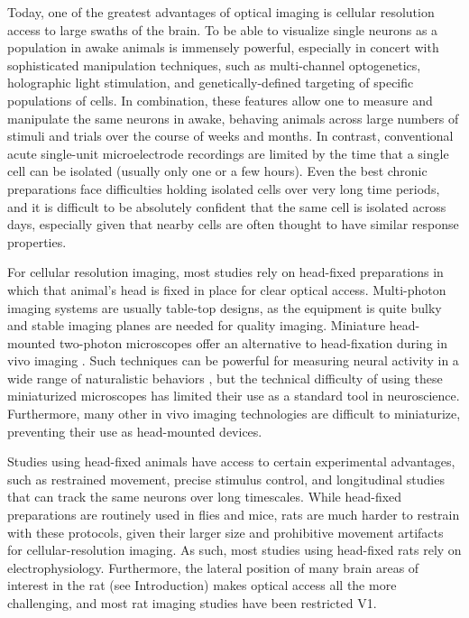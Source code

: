 Today, one of the greatest advantages of optical imaging is cellular resolution access to large swaths of the brain. To be able to visualize single neurons as a population in awake animals is immensely powerful, especially in concert with sophisticated manipulation techniques, such as multi-channel optogenetics\cite{Kampasi2018, Yang2018}, holographic light stimulation\cite{Gill2020, Chong2019, Carrillo-Reid2019}, and genetically-defined targeting of specific populations of cells\cite{Daigle2018}. In combination, these features allow one to measure and manipulate the same neurons in awake, behaving animals across large numbers of stimuli and trials over the course of weeks and months. In contrast, conventional acute single-unit microelectrode recordings are limited by the time that a single cell can be isolated (usually only one or a few hours). Even the best chronic preparations face difficulties holding isolated cells over very long time periods, and it is difficult to be absolutely confident that the same cell is isolated across days, especially given that nearby cells are often thought to have similar response properties.

For cellular resolution imaging, most studies rely on head-fixed preparations in which that animal's head is fixed in place for clear optical access. Multi-photon imaging systems are usually table-top designs, as the equipment is quite bulky and stable imaging planes are needed for quality imaging. Miniature head-mounted two-photon microscopes offer an alternative to head-fixation during in vivo imaging \cite{Helmchen2001, Sawinski2009}. Such techniques can be powerful for measuring neural activity in a wide range of naturalistic behaviors \cite{Sawinski2009}, but the technical difficulty of using these miniaturized microscopes has limited their use as a standard tool in neuroscience\cite{Kerr2012}. Furthermore, many other in vivo imaging technologies are difficult to miniaturize, preventing their use as head-mounted devices. 

Studies using head-fixed animals have access to certain experimental advantages, such as restrained movement, precise stimulus control, and longitudinal studies that can track the same neurons over long timescales. While head-fixed preparations are routinely used in flies and mice, rats are much harder to restrain with these protocols, given their larger size and prohibitive movement artifacts for cellular-resolution imaging. As such, most studies using head-fixed rats rely on electrophysiology. Furthermore, the lateral position of many brain areas of interest in the rat (see Introduction) makes optical access all the more challenging, and most rat imaging studies have been restricted V1\cite{Greenberg2008, Ohki2005, Scott2018}.

